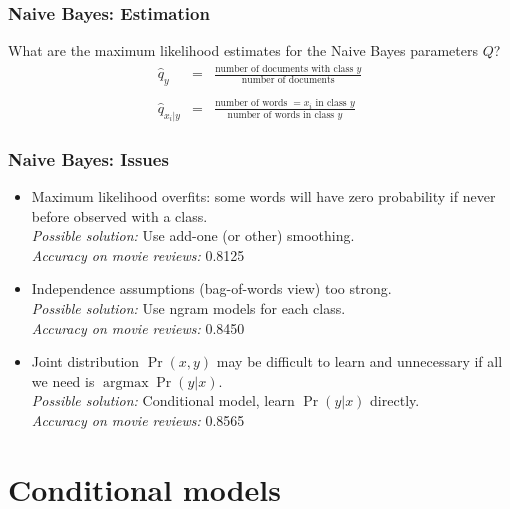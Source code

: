 \documentclass[ignorenonframetext,plain]{beamer}
\DeclareMathOperator*{\argmax}{argmax}
\begin{document}
\begin{frame}\frametitle{Naive Bayes: Estimation}
What are the maximum likelihood estimates for the Naive Bayes
parameters $Q$?\begin{eqnarray*}
\hat{q}_y &=& \frac{\mbox{number of documents with class
    $y$}}{\mbox{number of documents}}\\
\\
\hat{q}_{x_i|y} &=& \frac{\mbox{number of words $=x_i$ in class
    $y$}}{\mbox{number of words in class $y$}}
\end{eqnarray*}  
\end{frame}

\begin{frame}\frametitle{Naive Bayes: Issues}
\begin{itemize}
\item Maximum likelihood overfits: some words will have zero
  probability if never before observed with a class.
  \\ \textsl{Possible solution:} Use add-one (or other) smoothing.
  \\ \textsl{Accuracy on movie reviews:} 0.8125
\item Independence assumptions (bag-of-words view) too strong.
  \\ \textsl{Possible solution:} Use ngram models for each class.
  \\ \textsl{Accuracy on movie reviews:} 0.8450
\item Joint distribution $\Pr(x,y)$ may be difficult to learn and
  unnecessary if all we need is $\argmax\Pr(y|x)$.
  \\ \textsl{Possible solution:} Conditional model, learn
  $\Pr(y|x)$ directly.
  \\ \textsl{Accuracy on movie reviews:} 0.8565
\end{itemize}
\end{frame}

\section{Conditional models}
\frame{\sectionpage}
\end{document}
